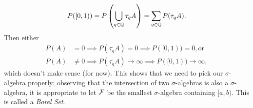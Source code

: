 \begin{itemize}
    \[ P([0, 1)) = P\left( \bigcup_{q \in \mathbb Q} \tau_q A \right) = \sum_{q \in \mathbb Q} P(\tau_q A). \]
    Then either
    \begin{align*}
        P(A) &= 0 \implies P(\tau_q A) = 0 \implies P([0, 1)) = 0, \text{or} \\
        P(A) &\neq 0 \implies P(\tau_q A) \to \infty \implies P([0, 1)) \to \infty,
    \end{align*}
    which doesn't make sense (for now). This shows that we need to pick our $\sigma$-algebra properly; observing that the intersection of two $\sigma$-algebras is also a $\sigma$-algebra, it is appropriate to let $\mathcal F$ be the smallest $\sigma$-algebra containing $[a, b)$. This is called a \textit{Borel Set}.
\end{itemize}
